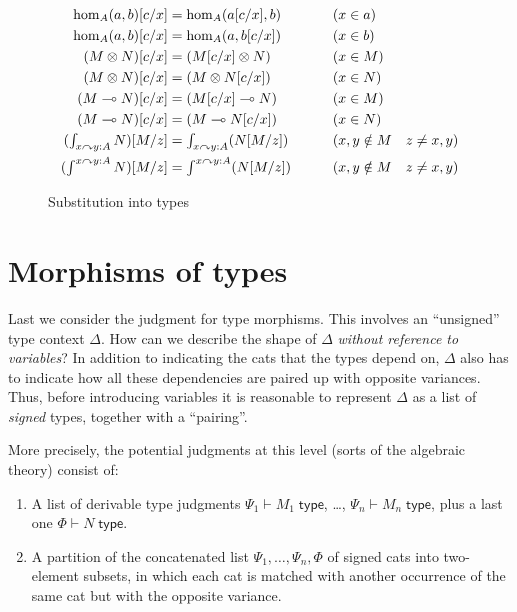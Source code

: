 \documentclass{amsart}
\let\types\vdash %
\def\type{\;\mathsf{type}}
\def\mor#1{\hom_{#1}}
\newcommand{\coend}{\begingroup\textstyle\int\endgroup}
\newcommand{\End}{\begingroup\textstyle\int\endgroup}
\newcommand{\strto}{\curvearrowright}
\theoremstyle{definition}
\begin{document}
\begin{figure}
  \centering
  \begin{alignat*}{2}
    \mor A(a,b)[c/x] &= \mor A(a[c/x],b) &&\qquad (x\in a)\\
    \mor A(a,b)[c/x] &= \mor A(a,b[c/x]) &&\qquad (x\in b)\\
    (M\otimes N)[c/x] &= (M[c/x] \otimes N) &&\qquad (x\in M)\\
    (M\otimes N)[c/x] &= (M \otimes N[c/x]) &&\qquad (x\in N)\\
    (M\multimap N)[c/x] &= (M[c/x] \multimap N) &&\qquad (x\in M)\\
    (M\multimap N)[c/x] &= (M \multimap N[c/x]) &&\qquad (x\in N)\\
    (\End_{x\strto y:A} N)[M/z] &= \End_{x\strto y:A} (N[M/z]) &&\qquad (x,y\notin M\quad z\neq x,y)\\
    (\coend^{x\strto y:A} N)[M/z] &= \coend^{x\strto y:A} (N[M/z]) &&\qquad (x,y\notin M\quad z\neq x,y)
  \end{alignat*}
  \caption{Substitution into types}
  \label{fig:sub-types}
\end{figure}


\section{Morphisms of types}
\label{sec:morphisms}

Last we consider the judgment for type morphisms.
This involves an ``unsigned'' type context $\Delta$.
How can we describe the shape of $\Delta$ \emph{without reference to variables}?
In addition to indicating the cats that the types depend on, $\Delta$ also has to indicate how all these dependencies are paired up with opposite variances.
Thus, before introducing variables it is reasonable to represent $\Delta$ as a list of \emph{signed} types, together with a ``pairing''.

More precisely, the potential judgments at this level (sorts of the algebraic theory) consist of:
\begin{enumerate}
\item A list of derivable type judgments $\Psi_1\types M_1\type$, \dots, $\Psi_n\types M_n\type$, plus a last one $\Phi\types N\type$.
\item A partition of the concatenated list $\Psi_1,\dots,\Psi_n,\Phi$ of signed cats into two-element subsets, in which each cat is matched with another occurrence of the same cat but with the opposite variance.
\end{enumerate}
\end{document}
